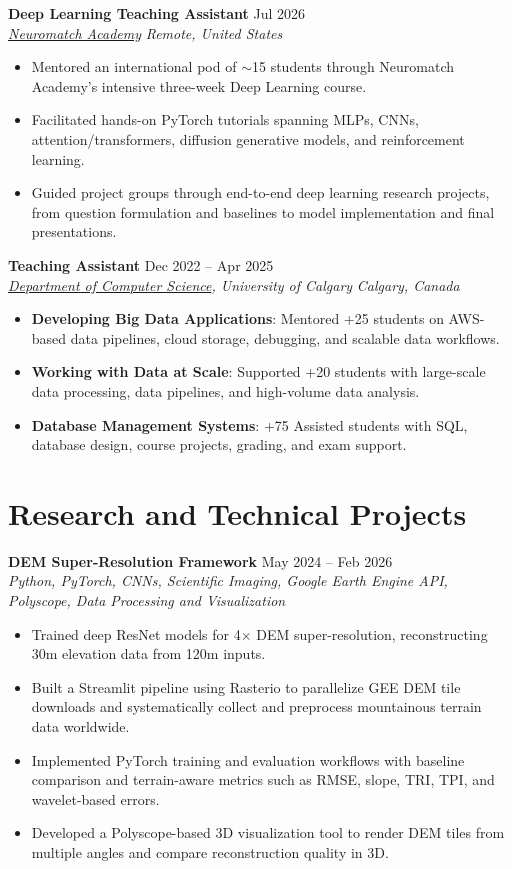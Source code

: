 \documentclass[a4paper,10pt]{article}
\newcommand{\resumeSubheading}[4]{
    \textbf{#1} \hfill #2 \\
    \textit{#3} \hfill \textit{#4}
}
\begin{document}
\resumeSubheading
{Deep Learning Teaching Assistant}
{Jul 2026}
{\href{https://neuromatch.io/}{Neuromatch Academy}}
{Remote, United States}
\begin{itemize}[leftmargin=0.25in]
    \item Mentored an international pod of $\sim$15 students through Neuromatch Academy's intensive three-week Deep Learning course.
    \item Facilitated hands-on PyTorch tutorials spanning MLPs, CNNs, attention/transformers, diffusion generative models, and reinforcement learning.
    \item Guided project groups through end-to-end deep learning research projects, from question formulation and baselines to model implementation and final presentations.
\end{itemize}

\resumeSubheading
{Teaching Assistant}
{Dec 2022 -- Apr 2025}
{\href{https://science.ucalgary.ca/computer-science} {Department of Computer Science}, University of Calgary}
{Calgary, Canada}
\begin{itemize}[leftmargin=0.25in]
    \item \textbf{Developing Big Data Applications}: Mentored +25 students on AWS-based data pipelines, cloud storage, debugging, and scalable data workflows. 
    \item \textbf{Working with Data at Scale}: Supported +20 students with large-scale data processing, data pipelines, and high-volume data analysis. 
    \item \textbf{Database Management Systems}: +75 Assisted students with SQL, database design, course projects, grading, and exam support.
\end{itemize}


\section*{Research and Technical Projects}

\noindent
\textbf{DEM Super-Resolution Framework} \hfill May 2024 -- Feb 2026 \\
\textit{Python, PyTorch, CNNs, Scientific Imaging, Google Earth Engine API, Polyscope, Data Processing and Visualization}
\begin{itemize}[leftmargin=0.25in]
    \item Trained deep ResNet models for 4$\times$ DEM super-resolution, reconstructing 30m elevation data from 120m inputs.
    \item Built a Streamlit pipeline using Rasterio to parallelize GEE DEM tile downloads and systematically collect and preprocess mountainous terrain data worldwide.
    \item Implemented PyTorch training and evaluation workflows with baseline comparison and terrain-aware metrics such as RMSE, slope, TRI, TPI, and wavelet-based errors.
    \item Developed a Polyscope-based 3D visualization tool to render DEM tiles from multiple angles and compare reconstruction quality in 3D.
\end{itemize}
\end{document}
